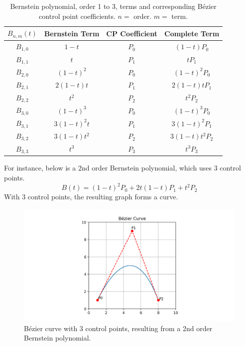 \documentclass[12pt,letterpaper]{article}
\begin{document}
\begin{table}[H]
    \centering
    \begin{tabular}{ | c | c c | c | }
        \hline
        $B_{n,m} (t)$ & Bernstein Term & CP Coefficient & Complete Term \\
        \hline
        $B_{1,0}$ & $1-t$ 		& $P_0$ & $(1-t)P_0$ 	    \\
        \hline
        $B_{1,1}$ & $t$ 		& $P_1$ & $tP_1$ 		    \\
        \hline
        $B_{2,0}$ & $(1-t)^2$ 	& $P_0$ & $(1-t)^2P_0$ 	    \\
        \hline
        $B_{2,1}$ & $2(1-t)t$ 	& $P_1$ & $2(1-t)tP_1$ 	    \\
        \hline
        $B_{2,2}$ & $t^2$ 		& $P_2$ & $t^2P_2$ 	        \\
        \hline
        $B_{3,0}$ & $(1-t)^3$ 	& $P_0$ & $(1-t)^3P_0$ 	    \\
        \hline
        $B_{3,1}$ & $3(1-t)^2t$ 	& $P_1$ & $3(1-t)^2P_1$	\\
        \hline
        $B_{3,2}$ & $3(1-t)t^2$ 	& $P_2$ & $3(1-t)t^2P_2$\\
        \hline
        $B_{3,3}$ & $t^3$ 		& $P_3$ & $t^3P_3$ 	        \\
        \hline
    \end{tabular}
    \caption{Bernstein polynomial, order 1 to 3, terms and corresponding B\'ezier control point coefficients. $n =$ order. $m =$ term.}
    \label{tab:coeffs}
\end{table}

For instance, below is a 2nd order Bernstein polynomial, which uses 3 control points.
$$B(t)= (1-t)^2 P_0+2t(1-t) P_1+t^2 P_2$$
With 3 control points, the resulting graph forms a curve.

\begin{figure}[H]
    \includegraphics[width=15cm]{Figure_4}
    \centering
    \caption{B\'ezier curve with 3 control points, resulting from a 2nd order Bernstein polynomial.}
    \label{fig:bez3}
\end{figure}
\end{document}
